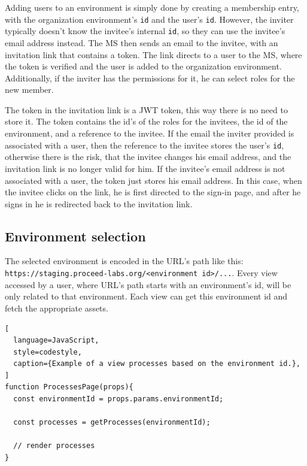Adding users to an environment is simply done by creating a membership entry, with the
organization environment's \lstinline{id} and the user's \lstinline{id}.
However, the inviter typically doesn't know the invitee's internal \lstinline{id},
so they can use the invitee's email address instead.
The MS then sends an email to the invitee, with an invitation link that contains a token.
The link directs to a user to the MS, where the token is verified and the user is added to
the organization environment.
Additionally, if the inviter has the permissions for it, he can select roles for the new member.

The token in the invitation link is a JWT token, this way there is no need to store it.
The token contains the id's of the roles for
the invitees, the id of the environment, and a reference to the invitee.
If the email the inviter provided is associated with a user, then the reference to the
invitee stores the user's \lstinline{id}, otherwise there is the risk, that the invitee
changes his email address, and the invitation link is no longer valid for him.
If the invitee's email address is not associated with a user, the token just stores his
email address.
In this case, when the invitee clicks on the link, he is first directed to the sign-in
page, and after he signs in he is redirected back to the invitation link.


\subsection{Environment selection}


The selected environment is encoded in the URL's path like this:
\lstinline{https://staging.proceed-labs.org/<environment id>/...}.
Every view accessed by a user, where URL's path starts with an environment's id, will be
only related to that environment.
Each view can get this environment id and fetch the appropriate assets.

\begin{lstlisting}[
  language=JavaScript,
  style=codestyle,
  caption={Example of a view processes based on the environment id.},
]
function ProcessesPage(props){
  const environmentId = props.params.environmentId; 

  const processes = getProcesses(environmentId);

  // render processes
}
\end{lstlisting}

